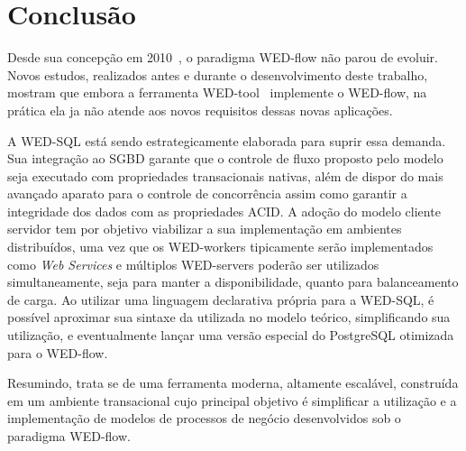 \documentclass[conference]{IEEEtran}
\begin{document}
\section{Conclusão}

Desde sua concepção em 2010~\cite{FTPM10}, o paradigma WED-flow não parou de evoluir. Novos estudos, realizados antes
e durante o desenvolvimento deste trabalho, mostram que embora a ferramenta WED-tool~\cite{WT} implemente o WED-flow, 
na prática ela ja não atende aos novos requisitos dessas novas aplicações. 
\par A WED-SQL está sendo estrategicamente elaborada para suprir essa demanda. Sua integração ao SGBD garante que o controle
de fluxo proposto pelo modelo seja executado com propriedades transacionais nativas, além de dispor do mais avançado aparato
para o controle de concorrência assim como garantir a integridade dos dados com as propriedades ACID. A adoção do modelo 
cliente servidor tem por objetivo viabilizar a sua implementação em ambientes distribuídos, uma vez que os WED-workers
tipicamente serão implementados como \emph{Web Services} e múltiplos WED-servers poderão ser utilizados simultaneamente,
seja para manter a disponibilidade, quanto para balanceamento de carga. Ao utilizar uma linguagem declarativa própria 
para a WED-SQL, é possível aproximar sua sintaxe da utilizada no modelo teórico, simplificando sua utilização, e eventualmente
lançar uma versão especial do PostgreSQL otimizada para o WED-flow.
\par Resumindo, trata se de uma ferramenta moderna, altamente escalável, construída em um ambiente transacional cujo
principal objetivo é simplificar a utilização e a implementação de modelos de processos de negócio desenvolvidos sob
o paradigma WED-flow.



%
\end{document}
